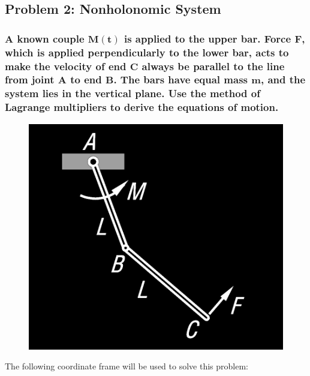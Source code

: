 \documentclass[12pt, letterpaper]{../assignment}
\begin{document}
\subsection*{Problem 2: Nonholonomic System}
\subsubsection*{A known couple $\bm{M(t)}$ is applied to the upper bar.
Force $\bm{F}$, which is applied perpendicularly to the lower bar,
acts to make the velocity of end $\bm{C}$ always be parallel to the line from joint $\bm{A}$ to end $\bm{B}$.
The bars have equal mass $\bm{m}$,
and the system lies in the vertical plane.
Use the method of Lagrange multipliers to derive the equations of motion.}

\begin{figure}[H]
    \centering
    \includegraphics[scale=0.35,frame]{images/Problem_2.png}
\end{figure}

The following coordinate frame will be used to solve this problem:
\end{document}
